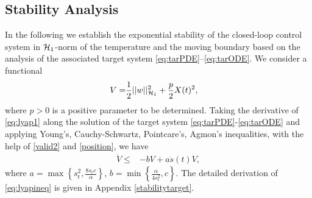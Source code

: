 \documentclass[journal]{IEEEtran}
\begin{document}
\subsection{Stability Analysis}\label{fbkstability}
In the following we establish the exponential stability of  the closed-loop control system in ${\cal H}_1$-norm of the temperature and the moving boundary  based on the analysis of the associated target system \eqref{eq:tarPDE}--\eqref{eq:tarODE}. We consider a functional
\begin{align}\label{eq:lyap1}
V = &\frac{1}{2}||w||_{{\cal H}_1}^2+\frac{p}{2}X(t)^2, 
\end{align}
where $p>0$  is a positive parameter to be determined. Taking the derivative of \eqref{eq:lyap1} along the solution of the target system \eqref{eq:tarPDE}-\eqref{eq:tarODE} and applying Young's, Cauchy-Schwartz, Pointcare's, Agmon's inequalities, with the help of \eqref{valid2} and \eqref{position}, we have
\begin{align}\label{eq:lyapineq}
\dot{V}\leq& -b V  + a\dot{s}(t) V, 
\end{align}
where $a = \max \left\{s_{{\mathrm r}}^2, \frac{8 s_{{\mathrm r}}c}{\alpha}\right\}$, $b =\min\left\{ \frac{\alpha}{4s_{{\mathrm r}}^{2}}, c \right\}$. 
 The detailed derivation of \eqref{eq:lyapineq} is given in Appendix \ref{stabilitytarget}.
\end{document}
